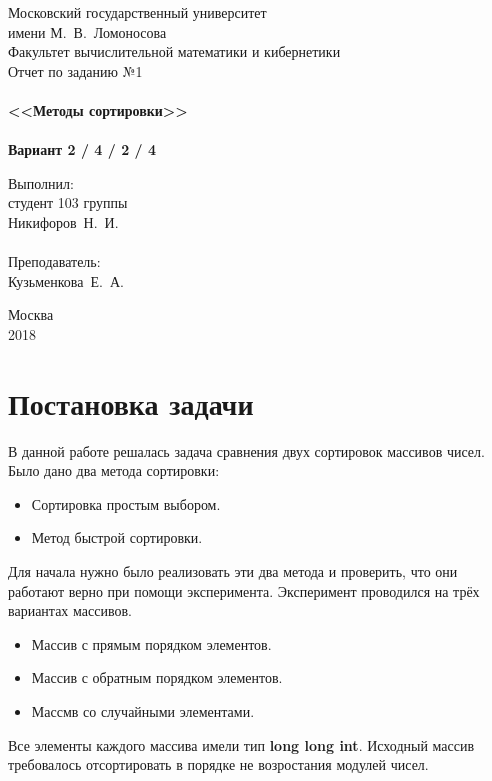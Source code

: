\documentclass[a4paper,12pt,titlepage,final]{article}
\begin{document}
\begin{titlepage}
    \begin{center}
	{\small \sc Московский государственный университет \\имени М.~В.~Ломоносова\\
	Факультет вычислительной математики и кибернетики\\}
	\vfill
	{\Large \sc Отчет по заданию №1}\\
	~\\
	{\large \bf <<Методы сортировки>>}\\ 
	~\\
	{\large \bf Вариант 2 / 4 / 2 / 4}
    \end{center}
    \begin{flushright}
	\vfill {Выполнил:\\
	студент 103 группы\\
	Никифоров~Н.~И.\\
	~\\
	Преподаватель:\\
	Кузьменкова~Е.~А.}
    \end{flushright}
    \begin{center}
	\vfill
	{\small Москва\\2018}
    \end{center}
\end{titlepage}

\tableofcontents
\newpage

\section{Постановка задачи}

В данной работе решалась задача сравнения двух сортировок массивов чисел. Было дано два метода сортировки:
\begin{itemize}
  \item Сортировка простым выбором.
  \item Метод быстрой сортировки.
\end{itemize}
Для начала нужно было реализовать эти два метода и проверить, что они работают верно при помощи эксперимента.
Эксперимент проводился на трёх вариантах массивов.
\begin{itemize}
  \item Массив с прямым порядком элементов.
  \item Массив с обратным порядком элементов.
  \item Массмв со случайными элементами.
\end{itemize}
Все элементы каждого массива имели тип {\bf \ttfamily long long int}.
Исходный массив требовалось отсортировать в порядке не возростания модулей чисел.
\end{document}
